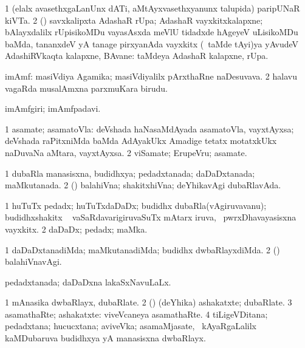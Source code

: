 \bentry
{}
\gl{\nA}
\bmng
\bnum
\num{1} (elalx avasethxgaLanUnx dATi, aMtAyxvasethxyanunx talupida) paripUNaR kiVTa. 
\num{2} (\mashA) savxkalipxta AdashaR rUpa; AdashaR vayxkitxkalapxne; bAlayxdalilx rUpisikoMDu vayasAsxda meVlU tidadxde hAgeyeV uLisikoMDu baMda, tananxdeV yA tanage pirxyanAda vayxkitx (\kanmu\ taMde tAyi)ya yAvudeV AdashiRVkaqta kalapxne, BAvane:  taMdeya AdashaR kalapxne, rUpa. 
\enum
\emng
\eentry

\bentry
{}
\gl{\nA}
\bmng
\bnum
{} imAmf: 
\banum
{} masiVdiya Agamika; masiVdiyalilx pArxthaRne naDesuvava. 
\eanum
\numie
\num{2} halavu vagaRda musalAmxna parxmuKara birudu. 
\enum
\emng
\eentry

\bentry
{}
\gl{\nA}
\bmng
imAmfgiri; imAmfpadavi. 
\emng
\eentry

\bentry
{}
\gl{\nA}
\bmng
\bnum
\num{1} asamate; asamatoVla:  deVshada haNasaMdAyada asamatoVla, vayxtAyxsa; deVshada raPitxniMda baMda AdAyakUkx Amadige tetatx motatxkUkx naDuvaNa aMtara, vayxtAyxsa. 
\num{2} viSamate; ErupeVru; asamate. 
\enum
\emng
\eentry

\bentry
{}
\gl{\gu}
\bmng
\bnum
\num{1} dubaRla manasisxna, budidhxya; pedadxtanada; daDaDxtanada; maMkutanada. 
\num{2} (\pArxparx) balahiVna; shakitxhiVna; deYhikavAgi dubaRlavAda. 
\enum
\emng
\eentry

\bentry
{}
\gl{\nA}
\bmng
\bnum
\num{1} huTuTx pedadx; huTuTxdaDaDx; budidhx dubaRla(vAgiruvavanu); budidhxshakitx \sA\  vaSaRdavarigiruvaSuTx mAtarx iruva, \kanmu\ pwrxDhavayasisxna vayxkitx. 
\num{2} daDaDx; pedadx; maMka. 
\enum
\emng
\eentry

\bentry
{}
\gl{\kirxvi}
\bmng
\bnum
\num{1} daDaDxtanadiMda; maMkutanadiMda; budidhx dwbaRlayxdiMda. 
\num{2} (\pArxparx) balahiVnavAgi. 
\enum
\emng
\eentry

\bentry
{}
\gl{\gu}
\bmng
pedadxtanada; daDaDxna lakaSxNavuLaLx. 
\emng
\eentry

\bentry
{}
\gl{\nA}
\bmng
\bnum
\num{1} mAnasika dwbaRlayx, dubaRlate. 
\num{2} (\pArxparx) (deYhika) ashakatxte; dubaRlate. 
\num{3} asamathaRte; ashakatxte:  viveVcaneya asamathaRte. 
\num{4} tiLigeVDitana; pedadxtana; hucucxtana; aviveVka; asamaMjasate, \kanmu\ kAyaRgaLalilx kaMDubaruva budidhxya yA manasisxna dwbaRlayx. 
\enum
\emng
\eentry

